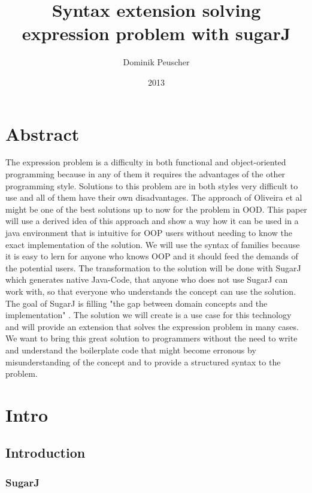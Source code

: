 \documentclass{report}
\author{Dominik Peuscher}
\title{Syntax extension solving expression problem with sugarJ}
\date{2013}
\begin{document}

\maketitle

\tableofcontents

\chapter*{Abstract}

The expression problem is a difficulty \cite{Wadler-Expression-1998} in both functional and object-oriented programming because in any of them it requires the advantages of the other programming style. Solutions to this problem are in both styles very difficult to use and all of them have their own disadvantages. The approach of Oliveira et al\cite{Oliv-Extensibility-2012} might be one of the best solutions up to now for the problem in OOD. This paper will use a derived idea of this approach and show a way how it can be used in a java environment that is intuitive for OOP users without needing to know the exact implementation of the solution. We will use the syntax of families because it is easy to lern for anyone who knows OOP and it should feed the demands of the potential users. The transformation to the solution will be done with SugarJ\cite{Erdweg-SugarJ-2011} which generates native Java-Code, that anyone who does not use SugarJ can work with, so that everyone who understands the concept can use the solution. The goal of SugarJ is filling "the gap between domain concepts and the implementation" \cite{Erdweg-SugarJ-2011}. The solution we will create is a use case for this technology and will provide an extension that solves the expression problem in many cases. We want to bring this great solution to programmers without the need to write and understand the boilerplate code that might become erronous by misunderstanding of the concept and to provide a structured syntax to the problem.

\chapter{Intro}

\section{Introduction}

\subsection{SugarJ}
\end{document}
